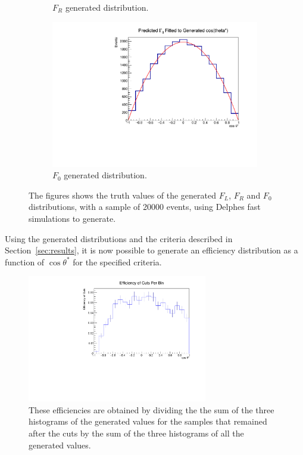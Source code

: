 \documentclass[12pt,a4paper]{article}
\numberwithin{equation}{section}
\begin{document}
\begin{figure}[H]
\begin{subfigure}[t]{0.5\textwidth}
        \caption{$F_R$ generated distribution.}
      \end{subfigure}
    \begin{subfigure}[t]{0.5\textwidth}
        \centering
        \includegraphics[width=1.0\textwidth]{figures/delphes_gen0}
        \caption{$F_0$ generated distribution.}
    \end{subfigure}
    \caption{The figures shows the truth values of the generated $F_L$, $F_R$ and
      $F_0$ distributions, with a sample of 20000 events, using Delphes fast
      simulations to generate.}\label{fig:delphesdist}
\end{figure}

Using the generated distributions and the criteria described in
Section~\ref{sec:results}, it is now possible to generate an efficiency
distribution as a function of $\cos \theta^*$ for the specified criteria.

\begin{figure}[H]
  \centering
  \includegraphics[width=0.7\textwidth]{figures/efficiency}
  \caption{\label{fig:efficiency}These efficiencies are obtained by dividing the
    the sum of the three histograms of the generated values for the samples that
    remained after the cuts by the sum of the three histograms of all the
    generated values.}
\end{figure}
\end{document}

